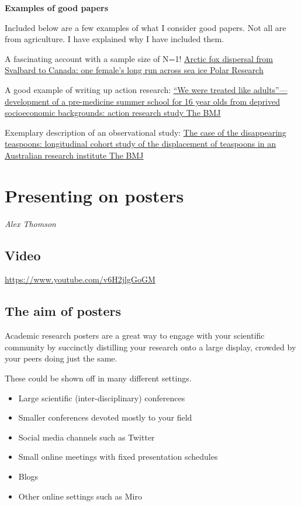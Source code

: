 \documentclass[
]{book}
\providecommand{\tightlist}{%
  \setlength{\itemsep}{0pt}\setlength{\parskip}{0pt}}
\begin{document}
\textbf{Examples of good papers}

Included below are a few examples of what I consider good papers. Not all are from agriculture. I have explained why I have included them.

A fascinating account with a sample size of N=1! \href{https://polarresearch.net/index.php/polar/article/view/3512}{Arctic fox dispersal from Svalbard to Canada: one female's long run across sea ice \textbar{} Polar Research}

A good example of writing up action research: \href{https://www.bmj.com/content/332/7544/762}{``We were treated like adults''---development of a pre-medicine summer school for 16 year olds from deprived socioeconomic backgrounds: action research study \textbar{} The BMJ}

Exemplary description of an observational study: \href{https://www.bmj.com/content/331/7531/1498}{The case of the disappearing teaspoons: longitudinal cohort study of the displacement of teaspoons in an Australian research institute \textbar{} The BMJ}

\hypertarget{posters}{%
\chapter{Presenting on posters}\label{posters}}

\emph{Alex Thomson}

\hypertarget{video-3}{%
\section{Video}\label{video-3}}

\label{fig:unnamed-chunk-28}\url{https://www.youtube.com/v6H2jlgGoGM}

\hypertarget{the-aim-of-posters}{%
\section{The aim of posters}\label{the-aim-of-posters}}

Academic research posters are a great way to engage with your scientific community by succinctly distilling your research onto a large display, crowded by your peers doing just the same.

These could be shown off in many different settings.

\begin{itemize}
\tightlist
\item
  Large scientific (inter-disciplinary) conferences
\item
  Smaller conferences devoted mostly to your field
\item
  Social media channels such as Twitter
\item
  Small online meetings with fixed presentation schedules
\item
  Blogs
\item
  Other online settings such as Miro
\end{itemize}
\end{document}
